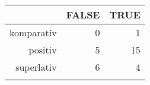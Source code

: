 \begin{tabular}{rrr}
  \lsptoprule
 & FALSE & TRUE \\ 
  \midrule
komparativ & 0 & 1 \\ 
  positiv & 5 & 15 \\ 
  superlativ & 6 & 4 \\ 
   \lspbottomrule
\end{tabular}
